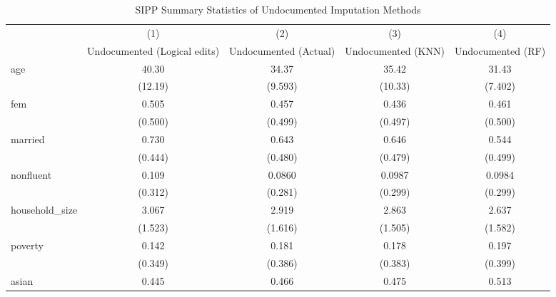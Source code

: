 \begin{table}[htbp]\centering
\def\sym#1{\ifmmode^{#1}\else\(^{#1}\)\fi}
\caption{SIPP Summary Statistics of Undocumented Imputation Methods \label{tab:sum}}
\begin{tabular}{l*{4}{c}}
\hline\hline
                    &\multicolumn{1}{c}{(1)}         &\multicolumn{1}{c}{(2)}         &\multicolumn{1}{c}{(3)}         &\multicolumn{1}{c}{(4)}         \\
                    &Undocumented (Logical edits)         &Undocumented (Actual)         &Undocumented (KNN)         &Undocumented (RF)         \\
\hline
age                 &       40.30         &       34.37         &       35.42         &       31.43         \\
                    &     (12.19)         &     (9.593)         &     (10.33)         &     (7.402)         \\
[1em]
fem                 &       0.505         &       0.457         &       0.436         &       0.461         \\
                    &     (0.500)         &     (0.499)         &     (0.497)         &     (0.500)         \\
[1em]
married             &       0.730         &       0.643         &       0.646         &       0.544         \\
                    &     (0.444)         &     (0.480)         &     (0.479)         &     (0.499)         \\
[1em]
nonfluent           &       0.109         &      0.0860         &      0.0987         &      0.0984         \\
                    &     (0.312)         &     (0.281)         &     (0.299)         &     (0.299)         \\
[1em]
household\_size      &       3.067         &       2.919         &       2.863         &       2.637         \\
                    &     (1.523)         &     (1.616)         &     (1.505)         &     (1.582)         \\
[1em]
poverty             &       0.142         &       0.181         &       0.178         &       0.197         \\
                    &     (0.349)         &     (0.386)         &     (0.383)         &     (0.399)         \\
[1em]
asian               &       0.445         &       0.466         &       0.475         &       0.513         \\

\end{tabular}
\end{table}

